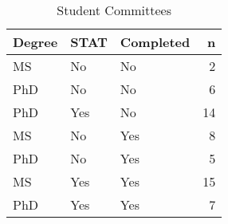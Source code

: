 \begin{table}[h]
\centering
\caption{Student Committees} 
\label{tab:committees}
\begin{tabular}{lllr}
  \hline
Degree & STAT & Completed & n \\ 
  \hline
MS & No & No &   2 \\ 
  PhD & No & No &   6 \\ 
  PhD & Yes & No &  14 \\ 
  MS & No & Yes &   8 \\ 
  PhD & No & Yes &   5 \\ 
  MS & Yes & Yes &  15 \\ 
  PhD & Yes & Yes &   7 \\ 
   \hline
\end{tabular}
\end{table}
